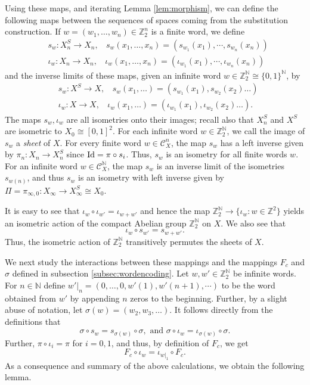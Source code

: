 \documentclass{amsart}
\theoremstyle{plain}
\theoremstyle{definition}
\numberwithin{equation}{section}
\numberwithin{theorem}{section}
\newcommand{\ZZ}{\mathbb{Z}}
\newcommand{\N}{\mathbb{N}}
\newcommand{\cC}{\mathcal{C}}
\begin{document}
Using these maps, and iterating Lemma \ref{lem:morphism}, we can define the following maps between the sequences of spaces coming from the substitution construction. If $w=(w_1, \dots, w_n)\in \ZZ_2^n$ is a finite word, we define
\begin{align*}
&s_w:X_n^S \to X_n, \ \ \ \ s_w(x_1, \dots, x_n) = (s_{w_1}(x_1), \cdots, s_{w_n}(x_n)) \\
&\iota_w:X_n \to X_n, \ \ \ \ \iota_w(x_1, \dots, x_n) = (\iota_{w_1}(x_1), \cdots, \iota_{w_n}(x_n))
\end{align*}
and the inverse limits of these maps, given an infinite word $w\in \ZZ_2^\N \cong \{0,1\}^\N$, by
\begin{align*}
&s_w:X^S \to X, \ \ \ \ s_w(x_1, \dots) = (s_{w_1}(x_1),s_{w_2}(x_2)\dots) \\
&\iota_w:X \to X, \ \ \ \ \iota_w(x_1, \dots) = (\iota_{w_1}(x_1),\iota_{w_2}(x_2) \dots).
\end{align*}
The maps $s_w, \iota_w$ are all isometries onto their images; recall also that $X_n^S$ and $X^S$ are isometric to $X_0\cong [0,1]^2$. For each infinite word $w\in \ZZ_2^\N$, we call the image of $s_w$ a \emph{sheet} of $X$. For every finite word $w\in \cC_X^n$, the map $s_w$ has a left inverse given by $\pi_n:X_n\to X_n^S$ since ${\rm Id}=\pi \circ s_i$. 
Thus, $s_w$ is an isometry for all finite words $w$.  For an infinite word $w\in \cC_X^\N$, the map $s_w$ is an inverse limit of the isometries $s_{w(n)}$, and thus $s_w$ is an isometry with left inverse given by $\Pi =\pi_{\infty,0}:X_\infty \to X_\infty^S\cong X_0$.


It is easy to see that $\iota_w \circ \iota_{w'}=\iota_{w+w'}$ and hence the map $\ZZ_2^\N \to \{\iota_w:w\in \ZZ^2\}$ yields an isometric action of the compact Abelian group $\ZZ_2^\N$ on $X$. We also see that
\[
\iota_w \circ s_{w'}=s_{w+w'}.
\]
Thus, the isometric action of $\ZZ_2^\N$ transitively permutes the sheets of $X$. 



We next study the interactions between these mappings and the mappings $F_c$ and $\sigma$ defined in subsection \ref{subsec:wordencoding}. Let $w,w'\in \ZZ_2^\N$ be infinite words. For $n\in \N$ define $w'|_n=(0,\dots, 0, w'(1), w'(n+1),\cdots)$ to be the word obtained from $w'$ by appending $n$ zeros to the beginning.  Further, by a slight abuse of notation, let $\sigma(w)=(w_2,w_3,\dots)$. It follows directly from the definitions that
\[
\sigma \circ s_w = s_{\sigma(w)} \circ \sigma, \text{ and } \sigma \circ \iota_w = \iota_{\sigma(w)} \circ \sigma.
\]
Further, $\pi \circ \iota_i = \pi$ for $i=0,1$, and thus, by definition of $F_c$, we get
\[
F_c \circ \iota_w = \iota_{w|_1} \circ F_c.
\]
As a consequence and summary of the above calculations, we obtain the following lemma.
\end{document}
